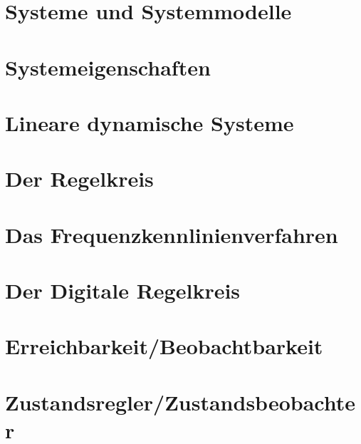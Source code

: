 	
	\tableofcontents %
	
	
	\section{Systeme und Systemmodelle} %
	
	\section{Systemeigenschaften}
	
	\section{Lineare dynamische Systeme}
	
	\section{Der Regelkreis}
	
	\section{Das Frequenzkennlinienverfahren}
	
	\section{Der Digitale Regelkreis}
	
	\section{Erreichbarkeit/Beobachtbarkeit}
	
	\section{Zustandsregler/Zustandsbeobachter}
	
